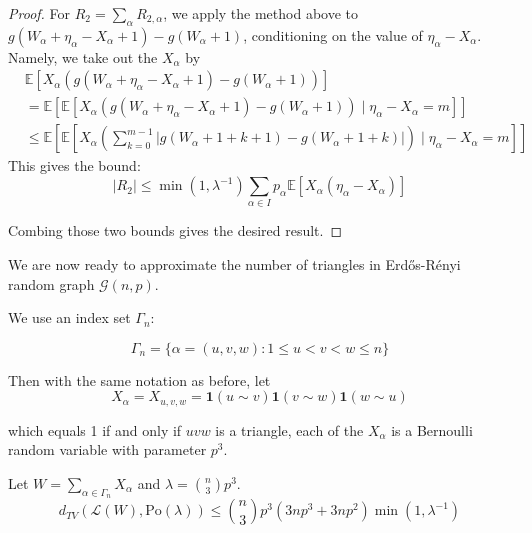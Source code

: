 \documentclass{article}
\begin{document}
\begin{proof}
    For $R_2=\sum_\alpha R_{2,\alpha}$, we apply the method above to $g(W_\alpha + \eta_\alpha - X_\alpha + 1) - g(W_\alpha + 1)$, conditioning on the value of $\eta_\alpha - X_\alpha$. Namely, we take out the $X_\alpha$ by
    \begin{align*}
        &\mathbb{E}[X_\alpha (g(W_\alpha + \eta_\alpha -X_\alpha +  1) - g(W_\alpha + 1))] \\
        &= \mathbb{E}[\mathbb{E}[X_\alpha (g(W_\alpha + \eta_\alpha -X_\alpha +  1) - g(W_\alpha + 1)) \mid \eta_\alpha - X_\alpha = m]] \\
        &\leq \mathbb{E}[\mathbb{E}[X_\alpha \left(\sum_{k=0}^{m-1} |g(W_\alpha + 1 + k+1) - g(W_\alpha + 1 + k)|\right) \mid \eta_\alpha - X_\alpha = m]]
    \end{align*}
    This gives the bound:
    \begin{equation*}
        |R_2| \leq \min (1, \lambda^{-1}) \sum_{\alpha \in I} p_\alpha \mathbb{E}[ X_\alpha (\eta_\alpha - X_\alpha)]
    \end{equation*}

    Combing those two bounds gives the desired result.
\end{proof}  

We are now ready to approximate the number of triangles in Erd\H{o}s-R\'{e}nyi random graph $\mathcal{G}(n,p)$.   

\medskip


We use an index set $\Gamma_n$:

\begin{equation*}
    \Gamma_{n}=\{\alpha=(u,v,w):1\leq u<v<w\leq n\}
\end{equation*}

Then with the same notation as before, let 
$$
X_{\alpha}=X_{u,v,w} = \mathbf{1}(u\sim v) \mathbf{1}(v\sim w) \mathbf{1}(w\sim u)
$$

which equals 1 if and only if $uvw$ is a triangle, each of the $X_\alpha$ is a Bernoulli random variable with parameter $p^3$. 

\begin{theorem}\label{thm:triangle_poisson_dependent}
    Let $W = \sum_{\alpha \in \Gamma_n} X_\alpha$ and $\lambda = \binom{n}{3}p^3$.
    \begin{equation*}
        d_{TV}(\mathcal{L}(W), \text{Po}(\lambda)) \leq \binom{n}{3}p^3(3np^3 + 3np^2) \min (1, \lambda^{-1})
    \end{equation*}
\end{theorem}
\end{document}
